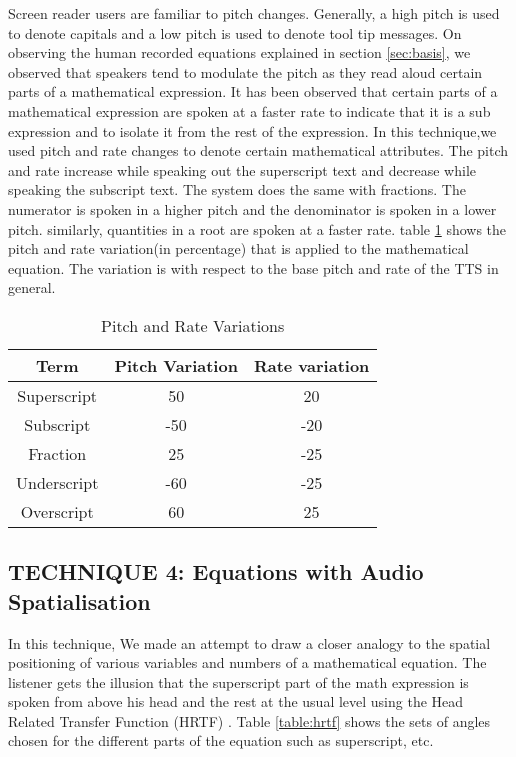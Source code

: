 \documentclass{article}
\begin{document}
Screen reader users are familiar to pitch changes. Generally, a high pitch is used to denote capitals and a low pitch is used to denote tool tip messages. On observing the human recorded equations explained in section \ref{sec:basis}, we observed that speakers tend to modulate the pitch as they read aloud certain parts of a mathematical expression. It has been observed that certain parts of a mathematical expression are spoken at a faster rate to indicate that it is a sub expression and to isolate it from the rest of the expression.
In this technique,we used pitch and rate changes to denote certain mathematical attributes. The pitch and rate increase while speaking out the superscript text and decrease while speaking the subscript text. The system does the same with fractions. The numerator is spoken in a higher pitch and the denominator is spoken in a lower pitch. similarly, quantities in a root are spoken at a faster rate. table \ref{table:pitchandrate} shows the pitch and rate variation(in percentage) that is applied to the mathematical equation. The variation is with respect to the base pitch and rate of the TTS in general. 



\begin{table}[t]
\caption{Pitch and Rate Variations}

\vspace{8pt} %

\centering
\begin{tabular}{|c | c | c | }
\hline%
Term & Pitch Variation & Rate variation \\[0.5ex]
\hline
Superscript & 50 & 20  \\
Subscript & -50 & -20  \\
Fraction & 25 & -25  \\
Underscript & -60 & -25  \\
Overscript & 60 & 25\\ %
\hline


\end{tabular}
\label{table:pitchandrate}
\end{table}




\subsection{TECHNIQUE 4: Equations with Audio Spatialisation}
\label{ssec:t4}
In this technique, We made an attempt to draw a closer analogy to the spatial positioning of various variables and numbers of a mathematical equation. The listener gets the illusion that the superscript part of the math expression is spoken from above his head and the rest at the usual level using the Head Related Transfer Function (HRTF) \cite{geronazzo2011head}.  Table 
\ref{table:hrtf} shows the sets of angles chosen for the different parts of the equation such as superscript, etc. 
\end{document}
